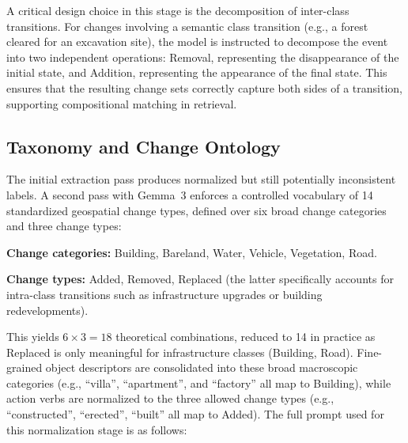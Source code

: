 A critical design choice in this stage is the decomposition
of inter-class transitions. For changes involving a semantic
class transition (e.g., a forest cleared for an excavation
site), the model is instructed to decompose the event into
two independent operations: Removal, representing the
disappearance of the initial state, and Addition,
representing the appearance of the final state. This ensures
that the resulting change sets correctly capture both sides
of a transition, supporting compositional matching in
retrieval.
 
\subsection{Taxonomy and Change Ontology}
\label{sec:chap7_ontology}
 
The initial extraction pass produces normalized but still
potentially inconsistent labels. A second pass with
Gemma~3 enforces a controlled vocabulary of 14
standardized geospatial change types, defined over six
broad change categories and three change types:
 
\textbf{Change categories:} Building, Bareland, Water,
Vehicle, Vegetation, Road.
 
\textbf{Change types:} Added, Removed, Replaced (the latter
specifically accounts for intra-class transitions such as
infrastructure upgrades or building redevelopments).
 
This yields $6 \times 3 = 18$ theoretical combinations,
reduced to 14 in practice as Replaced is only meaningful
for infrastructure classes (Building, Road). Fine-grained
object descriptors are consolidated into these broad
macroscopic categories (e.g., ``villa'', ``apartment'', and
``factory'' all map to Building), while action verbs are
normalized to the three allowed change types (e.g.,
``constructed'', ``erected'', ``built'' all map to Added).
 The full prompt used for this normalization stage is as
follows:
 
